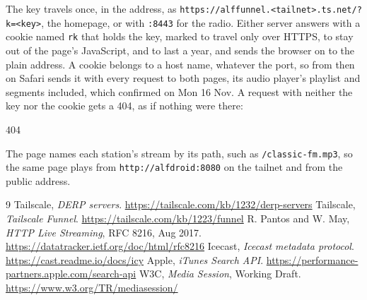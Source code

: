 \documentclass[11pt,a4paper]{article}
\begin{document}
The key travels once, in the address, as \texttt{https://alffunnel.<tailnet>.ts.net/?k=<key>}, the homepage, or with \texttt{:8443} for the radio. Either server answers with a cookie named \texttt{rk} that holds the key, marked to travel only over HTTPS, to stay out of the page's JavaScript, and to last a year, and sends the browser on to the plain address. A cookie belongs to a host name, whatever the port, so from then on Safari sends it with every request to both pages, its audio player's playlist and segments included, which  confirmed on Mon 16 Nov. A request with neither the key nor the cookie gets a 404, as if nothing were there:

\begin{cmdout}
404
\end{cmdout}

The page names each station's stream by its path, such as \texttt{/classic-fm.mp3}, so the same page plays from \texttt{http://alfdroid:8080} on the tailnet and from the public address.

\begin{thebibliography}{9}
   Tailscale, \textit{DERP servers}. \url{https://tailscale.com/kb/1232/derp-servers}
   Tailscale, \textit{Tailscale Funnel}. \url{https://tailscale.com/kb/1223/funnel}
   R. Pantos and W. May, \textit{HTTP Live Streaming}, RFC 8216, Aug 2017. \url{https://datatracker.ietf.org/doc/html/rfc8216}
   Icecast, \textit{Icecast metadata protocol}. \url{https://cast.readme.io/docs/icy}
   Apple, \textit{iTunes Search API}. \url{https://performance-partners.apple.com/search-api}
   W3C, \textit{Media Session}, Working Draft. \url{https://www.w3.org/TR/mediasession/}
\end{thebibliography}

\revisiontable
\end{document}
